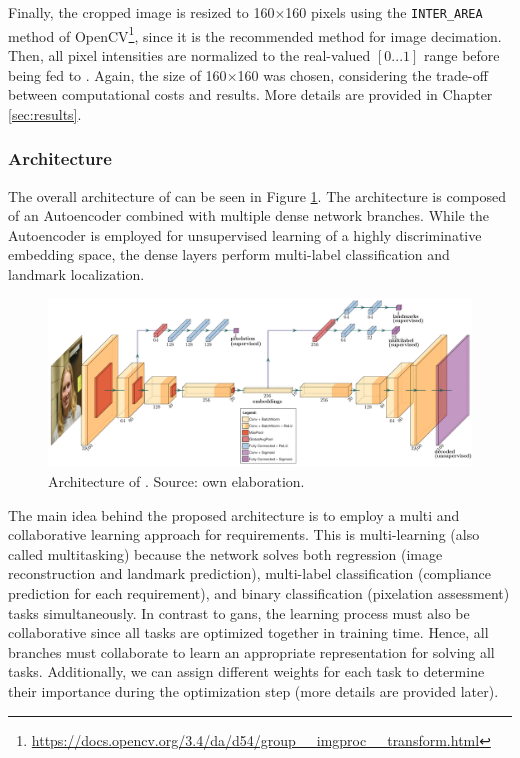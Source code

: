 Finally, the cropped image is resized to 160$\times$160 pixels using the \texttt{INTER\_AREA} method of OpenCV\footnote{\url{https://docs.opencv.org/3.4/da/d54/group__imgproc__transform.html}}, since it is the recommended method for image decimation. Then, all pixel intensities are normalized to the real-valued $[0...1]$ range before being fed to \methodname. Again, the size of 160$\times$160 was chosen, considering the trade-off between computational costs and results. More details are provided in Chapter \ref{sec:results}. 
 
\subsubsection{Architecture}
 
The overall architecture of \methodname can be seen in Figure \ref{fig:icaonet}. The architecture is composed of an Autoencoder combined with multiple dense network branches. While the Autoencoder is employed for unsupervised learning of a highly discriminative embedding space, the dense layers perform multi-label classification and landmark localization.
 
\begin{figure}[tb]
\centering
\includegraphics[width=\linewidth]{images/icaonet/icaonet.pdf}
\caption{Architecture of \methodname. Source: own elaboration.}
\label{fig:icaonet}
\end{figure}
 
The main idea behind the proposed architecture is to employ a multi and collaborative learning approach for \icao requirements. This is multi-learning (also called multitasking) because the network solves both regression (image reconstruction and landmark prediction), multi-label classification (compliance prediction for each requirement), and binary classification (pixelation assessment) tasks simultaneously. In contrast to \acfp{gan}, the learning process must also be collaborative since all tasks are optimized together in training time. Hence, all branches must collaborate to learn an appropriate representation for solving all tasks. Additionally, we can assign different weights for each task to determine their importance during the optimization step (more details are provided later).
 
